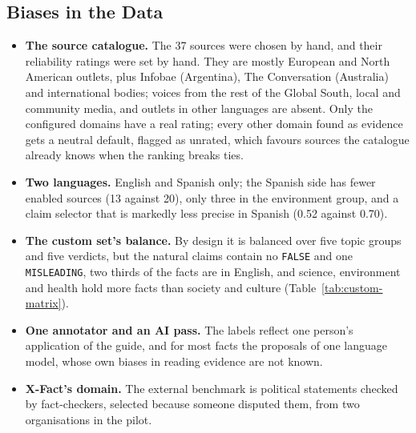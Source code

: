
\subsection{Biases in the Data}

\begin{itemize}
    \item \textbf{The source catalogue.} The 37 sources were chosen by
    hand, and their reliability ratings were set by hand. They are
    mostly European and North American outlets, plus Infobae
    (Argentina), The Conversation (Australia) and international bodies;
    voices from the rest of the Global South, local
    and community media, and outlets in other languages are absent. Only
    the configured domains have a real rating; every other domain found
    as evidence gets a neutral default, flagged as unrated, which favours
    sources the catalogue already knows when the ranking breaks ties.
    \item \textbf{Two languages.} English and Spanish only; the Spanish
    side has fewer enabled sources (13 against 20), only three in the
    environment group, and a claim selector that is markedly less
    precise in Spanish (0.52 against 0.70).
    \item \textbf{The custom set's balance.} By design it is balanced
    over five topic groups and five verdicts, but the natural claims
    contain no \texttt{FALSE} and one \texttt{MISLEADING}, two thirds of
    the facts are in English, and science, environment and health hold
    more facts than society and culture
    (Table~\ref{tab:custom-matrix}).
    \item \textbf{One annotator and an AI pass.} The labels reflect one
    person's application of the guide, and for most facts the
    proposals of one language model, whose own biases in reading
    evidence are not known.
    \item \textbf{X-Fact's domain.} The external benchmark is political
    statements checked by fact-checkers, selected because someone
    disputed them, from two organisations in the pilot.
\end{itemize}
